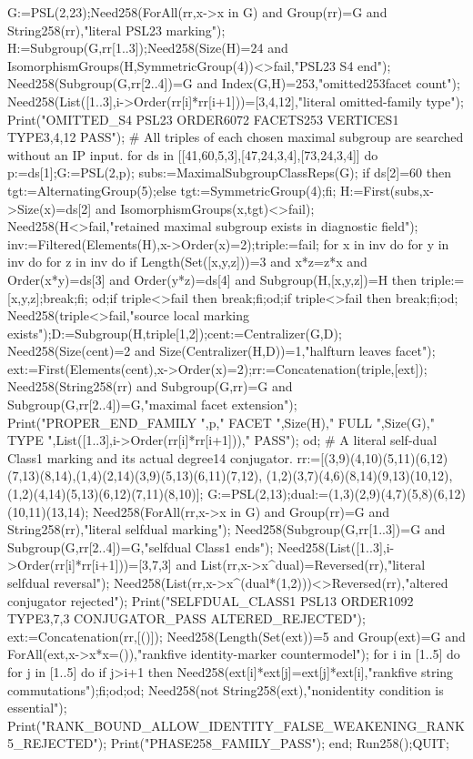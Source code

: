 \documentclass[11pt,a4paper]{article}
\begin{document}
\begin{CompleteProgram}
 G:=PSL(2,23);Need258(ForAll(rr,x->x in G) and Group(rr)=G and String258(rr),"literal PSL23 marking");
 H:=Subgroup(G,rr{[1..3]});Need258(Size(H)=24 and IsomorphismGroups(H,SymmetricGroup(4))<>fail,"PSL23 S4 end");
 Need258(Subgroup(G,rr{[2..4]})=G and Index(G,H)=253,"omitted253facet count");
 Need258(List([1..3],i->Order(rr[i]*rr[i+1]))=[3,4,12],"literal omitted-family type");
 Print("OMITTED_S4 PSL23 ORDER6072 FACETS253 VERTICES1 TYPE3,4,12 PASS\n");
 # All triples of each chosen maximal subgroup are searched without an IP input.
 for ds in [[41,60,5,3],[47,24,3,4],[73,24,3,4]] do
 p:=ds[1];G:=PSL(2,p);
 subs:=MaximalSubgroupClassReps(G);
 if ds[2]=60 then tgt:=AlternatingGroup(5);else tgt:=SymmetricGroup(4);fi;
 H:=First(subs,x->Size(x)=ds[2] and IsomorphismGroups(x,tgt)<>fail);
 Need258(H<>fail,"retained maximal subgroup exists in diagnostic field");
 inv:=Filtered(Elements(H),x->Order(x)=2);triple:=fail;
 for x in inv do for y in inv do for z in inv do
 if Length(Set([x,y,z]))=3 and x*z=z*x and Order(x*y)=ds[3] and Order(y*z)=ds[4] and Subgroup(H,[x,y,z])=H then triple:=[x,y,z];break;fi;
 od;if triple<>fail then break;fi;od;if triple<>fail then break;fi;od;
 Need258(triple<>fail,"source local marking exists");D:=Subgroup(H,triple{[1,2]});cent:=Centralizer(G,D);
 Need258(Size(cent)=2 and Size(Centralizer(H,D))=1,"halfturn leaves facet");
 ext:=First(Elements(cent),x->Order(x)=2);rr:=Concatenation(triple,[ext]);
 Need258(String258(rr) and Subgroup(G,rr)=G and Subgroup(G,rr{[2..4]})=G,"maximal facet extension");
 Print("PROPER_END_FAMILY ",p," FACET ",Size(H)," FULL ",Size(G)," TYPE ",List([1..3],i->Order(rr[i]*rr[i+1]))," PASS\n");
 od;
 # A literal self-dual Class1 marking and its actual degree14 conjugator.
 rr:=[(3,9)(4,10)(5,11)(6,12)(7,13)(8,14),(1,4)(2,14)(3,9)(5,13)(6,11)(7,12),
 (1,2)(3,7)(4,6)(8,14)(9,13)(10,12),(1,2)(4,14)(5,13)(6,12)(7,11)(8,10)];
 G:=PSL(2,13);dual:=(1,3)(2,9)(4,7)(5,8)(6,12)(10,11)(13,14);
 Need258(ForAll(rr,x->x in G) and Group(rr)=G and String258(rr),"literal selfdual marking");
 Need258(Subgroup(G,rr{[1..3]})=G and Subgroup(G,rr{[2..4]})=G,"selfdual Class1 ends");
 Need258(List([1..3],i->Order(rr[i]*rr[i+1]))=[3,7,3] and List(rr,x->x^dual)=Reversed(rr),"literal selfdual reversal");
 Need258(List(rr,x->x^(dual*(1,2)))<>Reversed(rr),"altered conjugator rejected");
 Print("SELFDUAL_CLASS1 PSL13 ORDER1092 TYPE3,7,3 CONJUGATOR_PASS ALTERED_REJECTED\n");
 ext:=Concatenation(rr,[()]);
 Need258(Length(Set(ext))=5 and Group(ext)=G and ForAll(ext,x->x*x=()),"rankfive identity-marker countermodel");
 for i in [1..5] do for j in [1..5] do if j>i+1 then
 Need258(ext[i]*ext[j]=ext[j]*ext[i],"rankfive string commutations");fi;od;od;
 Need258(not String258(ext),"nonidentity condition is essential");
 Print("RANK_BOUND_ALLOW_IDENTITY_FALSE_WEAKENING_RANK5_REJECTED\n");
 Print("PHASE258_FAMILY_PASS\n");
end;
Run258();QUIT;
\end{CompleteProgram}
\end{document}
